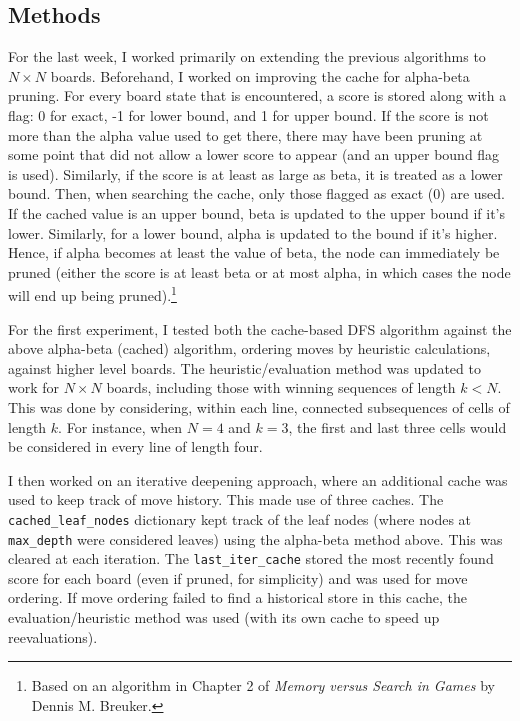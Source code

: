 \documentclass[12pt]{article}
\begin{document}
\subsection*{Methods}
For the last week, I worked primarily on extending the previous algorithms to \(N\times N\) boards. Beforehand, I worked on improving the cache for alpha-beta pruning. For every board state that is encountered, a score is stored along with a flag: 0 for exact, -1 for lower bound, and 1 for upper bound. If the score is not more than the alpha value used to get there, there may have been pruning at some point that did not allow a lower score to appear (and an upper bound flag is used). Similarly, if the score is at least as large as beta, it is treated as a lower bound. Then, when searching the cache, only those flagged as exact (0) are used. If the cached value is an upper bound, beta is updated to the upper bound if it's lower. Similarly, for a lower bound, alpha is updated to the bound if it's higher. Hence, if alpha becomes at least the value of beta, the node can immediately be pruned (either the score is at least beta or at most alpha, in which cases the node will end up being pruned).\footnote{Based on an algorithm in Chapter 2 of \textit{Memory versus Search in Games} by Dennis M. Breuker.}

For the first experiment, I tested both the cache-based DFS algorithm against the above alpha-beta (cached) algorithm, ordering moves by heuristic calculations, against higher level boards. The heuristic/evaluation method was updated to work for \(N\times N\) boards, including those with winning sequences of length \(k<N\). This was done by considering, within each line, connected subsequences of cells of length \(k\). For instance, when \(N=4\) and \(k=3\), the first and last three cells would be considered in every line of length four.

I then worked on an iterative deepening approach, where an additional cache was used to keep track of move history. This made use of three caches. The \texttt{cached\_leaf\_nodes} dictionary kept track of the leaf nodes (where nodes at \texttt{max\_depth} were considered leaves) using the alpha-beta method above. This was cleared at each iteration. The \texttt{last\_iter\_cache} stored the most recently found score for each board (even if pruned, for simplicity) and was used for move ordering. If move ordering failed to find a historical store in this cache, the evaluation/heuristic method was used (with its own cache to speed up reevaluations).
\end{document}
